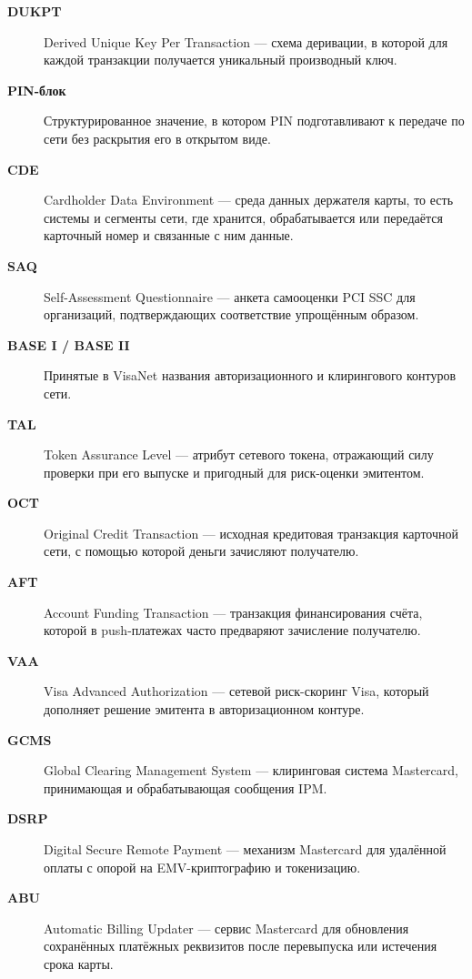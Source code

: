 \begin{description}
  \item[\textbf{DUKPT}] Derived Unique Key Per Transaction — схема деривации, в которой для каждой транзакции получается уникальный производный ключ.

  \item[\textbf{PIN-блок}] Структурированное значение, в котором PIN подготавливают к передаче по сети без раскрытия его в открытом виде.

  \item[\textbf{CDE}] Cardholder Data Environment — среда данных держателя карты, то есть системы и сегменты сети, где хранится, обрабатывается или передаётся карточный номер и связанные с ним данные.

  \item[\textbf{SAQ}] Self-Assessment Questionnaire — анкета самооценки PCI SSC для организаций, подтверждающих соответствие упрощённым образом.

  \item[\textbf{BASE I / BASE II}] Принятые в VisaNet названия авторизационного и клирингового контуров сети.

  \item[\textbf{TAL}] Token Assurance Level — атрибут сетевого токена, отражающий силу проверки при его выпуске и пригодный для риск-оценки эмитентом.

  \item[\textbf{OCT}] Original Credit Transaction — исходная кредитовая транзакция карточной сети, с помощью которой деньги зачисляют получателю.

  \item[\textbf{AFT}] Account Funding Transaction — транзакция финансирования счёта, которой в push-платежах часто предваряют зачисление получателю.

  \item[\textbf{VAA}] Visa Advanced Authorization — сетевой риск-скоринг Visa, который дополняет решение эмитента в авторизационном контуре.

  \item[\textbf{GCMS}] Global Clearing Management System — клиринговая система Mastercard, принимающая и обрабатывающая сообщения IPM.

  \item[\textbf{DSRP}] Digital Secure Remote Payment — механизм Mastercard для удалённой оплаты с опорой на EMV-криптографию и токенизацию.

  \item[\textbf{ABU}] Automatic Billing Updater — сервис Mastercard для обновления сохранённых платёжных реквизитов после перевыпуска или истечения срока карты.


\end{description}
